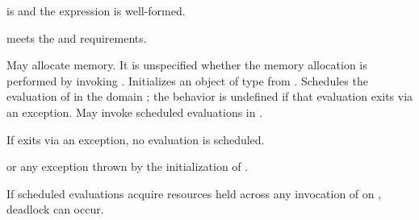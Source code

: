\begin{itemdescr}

\pnum
\mandates
{} is  and
the expression  is well-formed.

\pnum
\expects
{} meets the  and
 requirements.

\pnum
\effects
May allocate memory.
It is unspecified whether the memory allocation is performed by
invoking  .
Initializes an object  of type  from
.
Schedules the evaluation of  in the domain
; the behavior is undefined if that evaluation
exits via an exception.
May invoke scheduled evaluations in .
\begin{note}
If  exits via an exception, no evaluation
is scheduled.
\end{note}

\pnum
\throws
{} or
any exception thrown by the initialization of .

\pnum
\begin{note}
If scheduled evaluations acquire resources held across any invocation
of  on , deadlock can occur.
\end{note}

\end{itemdescr}
